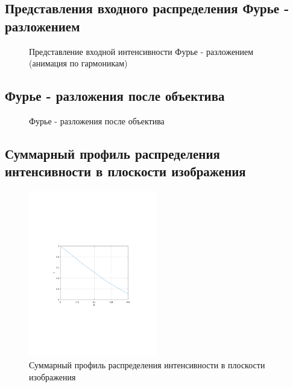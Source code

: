 \documentclass[14pt,a4paper]{extarticle}
\begin{document}
\subsection{Представления входного распределения Фурье - разложением}
\begin{figure}[H]
	\begin{center}\caption{Представление входной интенсивности Фурье - разложением (анимация по гармоникам)}\label{gr:fourier}
	\end{center}
\end{figure}

\subsection{Фурье - разложения после объектива}
\begin{figure}[H]
	\begin{center}\caption{Фурье - разложения после объектива}\label{gr:ob}
	\end{center}
\end{figure}
\subsection{Суммарный профиль распределения интенсивности в плоскости изображения}
\begin{figure}[H]
	\begin{center}\caption{Суммарный профиль распределения интенсивности в плоскости изображения}\label{gr:kpm}
		\includegraphics[trim=110 230 110 250,clip, width=0.5\textwidth]{fpm.pdf}
	\end{center}
\end{figure}
\end{document}
